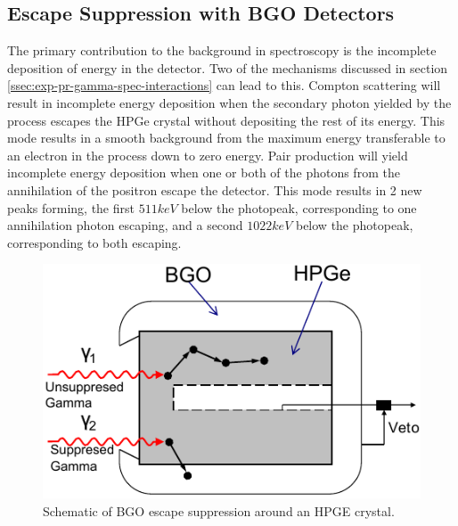 \subsection{Escape Suppression with BGO Detectors}
\label{ssec:exp-pr-gamma-spec-escape-supress}
The primary contribution to the background in \gr{} spectroscopy is the incomplete deposition of energy in the detector. Two of the mechanisms discussed in section \ref{ssec:exp-pr-gamma-spec-interactions} can lead to this. Compton scattering will result in incomplete energy deposition when the secondary photon yielded by the process escapes the HPGe crystal without depositing the rest of its energy. This mode results in a smooth background from the maximum energy transferable to an electron in the process down to zero energy. Pair production will yield incomplete energy deposition when one or both of the photons from the annihilation of the positron escape the detector. This mode results in 2 new peaks forming, the first $511keV$ below the photopeak, corresponding to one annihilation photon escaping, and a second $1022keV$ below the photopeak, corresponding to both escaping.
\begin{figure}[h!]
	\centerline{\includegraphics[height=0.25\textheight]{./img/c3/BGO_schematic.pdf}}
	\caption{Schematic of BGO escape suppression around an HPGE crystal.}
	\label{fig:chp3-supression-schematic}
\end{figure}


